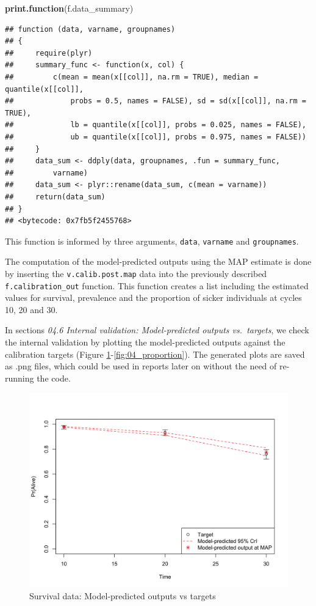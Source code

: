 \documentclass[]{article}
\newenvironment{Shaded}{\begin{snugshade}}{\end{snugshade}}
\newcommand{\KeywordTok}[1]{\textcolor[rgb]{0.13,0.29,0.53}{\textbf{#1}}}
\newcommand{\NormalTok}[1]{#1}
\begin{document}
\begin{Shaded}
\begin{Highlighting}[]
\KeywordTok{print.function}\NormalTok{(f.data_summary)}
\end{Highlighting}
\end{Shaded}

\begin{verbatim}
## function (data, varname, groupnames) 
## {
##     require(plyr)
##     summary_func <- function(x, col) {
##         c(mean = mean(x[[col]], na.rm = TRUE), median = quantile(x[[col]], 
##             probs = 0.5, names = FALSE), sd = sd(x[[col]], na.rm = TRUE), 
##             lb = quantile(x[[col]], probs = 0.025, names = FALSE), 
##             ub = quantile(x[[col]], probs = 0.975, names = FALSE))
##     }
##     data_sum <- ddply(data, groupnames, .fun = summary_func, 
##         varname)
##     data_sum <- plyr::rename(data_sum, c(mean = varname))
##     return(data_sum)
## }
## <bytecode: 0x7fb5f2455768>
\end{verbatim}

This function is informed by three arguments, \texttt{data},
\texttt{varname} and \texttt{groupnames}.

The computation of the model-predicted outputs using the MAP estimate is
done by inserting the \texttt{v.calib.post.map} data into the previously
described \texttt{f.calibration\_out} function. This function creates a
list including the estimated values for survival, prevalence and the
proportion of sicker individuals at cycles 10, 20 and 30.

In sections \emph{04.6 Internal validation: Model-predicted outputs
vs.~targets}, we check the internal validation by plotting the
model-predicted outputs against the calibration targets (Figure
\ref{fig:04_surv}-\ref{fig:04_proportion}). The generated plots are
saved as .png files, which could be used in reports later on without the
need of re-running the code.

\begin{figure}
\centering
\includegraphics{../figs/04_posterior-vs-targets-survival.png}
\caption{Survival data: Model-predicted outputs vs targets
\label{fig:04_surv}}
\end{figure}
\end{document}

